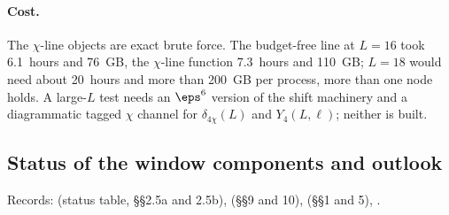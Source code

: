 \paragraph{Cost.} The $\chi$-line objects are exact brute force. The budget-free line at $L=16$ took 6.1~hours and 76~GB, the
$\chi$-line function 7.3~hours and 110~GB; $L=18$ would need about 20~hours and more than 200~GB per process, more than one
node holds. A large-$L$ test needs an $\eps^6$ version of the shift machinery and a diagrammatic tagged $\chi$ channel for
$\delta_{4\chi}(L)$ and $Y_4(L,\ell)$; neither is built.

\subsection{Status of the window components and outlook}\label{d2:app:status}
{\small\raggedright\noindent Records:  (status table, \S\S2.5a and 2.5b),
 (\S\S9 and 10),  (\S\S1 and 5),
.\par}

